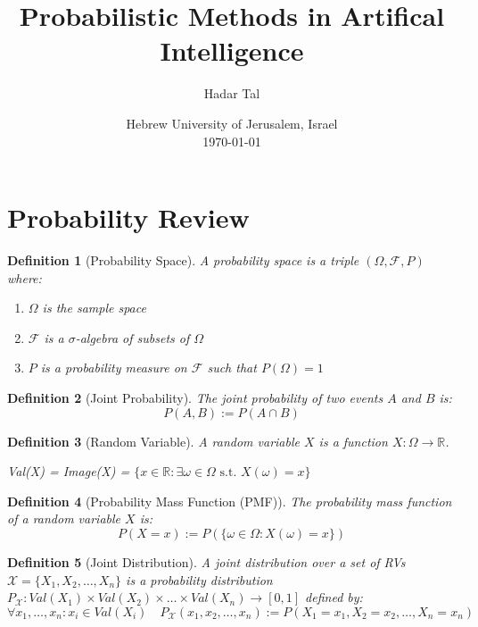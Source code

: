 \documentclass[11pt]{article}
\title{
    \huge Probabilistic Methods in Artifical Intelligence\\
    \vspace{10pt}
}
\author{Hadar Tal}
\date{Hebrew University of Jerusalem, Israel\\
    \vspace{10pt}
    \today}
\numberwithin{equation}{section}
\theoremstyle{boldStyle}
\theoremstyle{boldBlueStyle}
\theoremstyle{boldPurpleStyle}
\theoremstyle{boldRedStyle}
\newtheorem{definition}{Definition}[section]
\begin{document}
\maketitle

\section{Probability Review}

\begin{definition}[Probability Space]
    A probability space is a triple $(\Omega, \mathcal{F}, P)$ where:
    \begin{enumerate}
        \item $\Omega$ is the sample space
        \item $\mathcal{F}$ is a $\sigma$-algebra of subsets of $\Omega$
        \item $P$ is a probability measure on $\mathcal{F}$ such that $P(\Omega) = 1$
    \end{enumerate}
\end{definition}

\begin{definition}[Joint Probability]
    The joint probability of two events $A$ and $B$ is:
    \begin{equation*}
        P(A, B) := P(A \cap B) 
    \end{equation*}
\end{definition}

\begin{definition}[Random Variable]
    A random variable $X$ is a function $X: \Omega \rightarrow \mathbb{R}$. 

    Val(X) = Image(X) = $\{ x \in \mathbb{R} : \exists \omega \in \Omega \text{ s.t. } X(\omega) = x \}$
\end{definition}

\begin{definition}[Probability Mass Function (PMF)]
    The probability mass function of a random variable $X$ is:
    \begin{equation*}
        P(X = x) := P(\{ \omega \in \Omega : X(\omega) = x \})
    \end{equation*}
\end{definition}

\begin{definition}[Joint Distribution]
    A joint distribution over a set of RVs $\mathcal{X} = \{ X_1, X_2, \ldots, X_n \}$ is a probability distribution 
    $P_{\mathcal{X}}: Val(X_1) \times Val(X_2) \times \ldots \times Val(X_n) \rightarrow [0, 1]$ defined by:
    \begin{equation*}
       \forall x_1, \ldots, x_n : x_i \in Val(X_i) \quad
        P_{\mathcal{X}}(x_1, x_2, \ldots, x_n) := P(X_1 = x_1, X_2 = x_2, \ldots, X_n = x_n)
    \end{equation*}
\end{definition}
\end{document}
